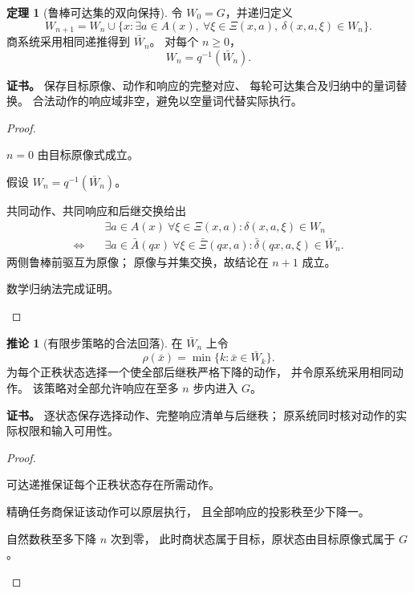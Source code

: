 \documentclass[UTF8,12pt,a4paper,openany,fontset=none,zihao=false]{ctexrep}
\theoremstyle{definition}
\newtheorem{theorem}{定理}[chapter]
\newtheorem{corollary}{推论}[chapter]
\newenvironment{certificate}{\par\noindent\textbf{证书。}\ignorespaces}{\par}
\newcommand{\1}{\mathbf 1}
\begin{document}
\begin{theorem}[鲁棒可达集的双向保持]
\label{q:reachability}
令 \(W_0=G\)，并递归定义
\[
W_{n+1}
=W_n\cup
\{x:\exists a\in A(x),\
\forall\xi\in\Xi(x,a),\
\delta(x,a,\xi)\in W_n\}.
\]
商系统采用相同递推得到 \(\bar W_n\)。
对每个 \(n\ge0\)，
\[
W_n=q^{-1}(\bar W_n).
\]
\end{theorem}
\begin{certificate}
保存目标原像、动作和响应的完整对应、
每轮可达集合及归纳中的量词替换。
合法动作的响应域非空，避免以空量词代替实际执行。
\end{certificate}
\begin{proof}
\begin{semanticsteps}
\item \(n=0\) 由目标原像式成立。
\item 假设 \(W_n=q^{-1}(\bar W_n)\)。
\item 共同动作、共同响应和后继交换给出
\[
\begin{aligned}
&\exists a\in A(x)\ \forall\xi\in\Xi(x,a):
\delta(x,a,\xi)\in W_n\\
\Longleftrightarrow\quad&
\exists a\in\bar A(qx)\ \forall\xi\in\bar\Xi(qx,a):
\bar\delta(qx,a,\xi)\in\bar W_n.
\end{aligned}
\]
两侧鲁棒前驱互为原像；
原像与并集交换，故结论在 \(n+1\) 成立。
\item 数学归纳法完成证明。
\end{semanticsteps}
\end{proof}
\begin{corollary}[有限步策略的合法回落]
\label{q:policy}
在 \(\bar W_n\) 上令
\[
\rho(\bar x)=\min\{k:\bar x\in\bar W_k\}.
\]
为每个正秩状态选择一个使全部后继秩严格下降的动作，
并令原系统采用相同动作。
该策略对全部允许响应在至多 \(n\) 步内进入 \(G\)。
\end{corollary}
\begin{certificate}
逐状态保存选择动作、完整响应清单与后继秩；
原系统同时核对动作的实际权限和输入可用性。
\end{certificate}
\begin{proof}
\begin{semanticsteps}
\item 可达递推保证每个正秩状态存在所需动作。
\item 精确任务商保证该动作可以原层执行，
且全部响应的投影秩至少下降一。
\item 自然数秩至多下降 \(n\) 次到零，
此时商状态属于目标，原状态由目标原像式属于 \(G\)。
\end{semanticsteps}
\end{proof}
\end{document}
